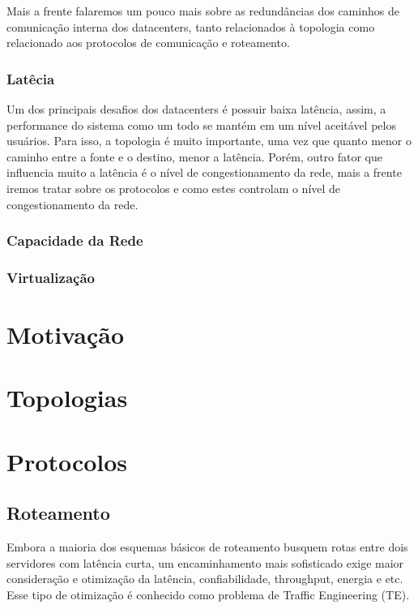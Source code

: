 \documentclass[12pt,a4paper]{report}
\begin{document}
Mais a frente falaremos um pouco mais sobre as redundâncias dos caminhos de comunicação interna dos datacenters, tanto relacionados à topologia como relacionado aos protocolos de comunicação e roteamento.\\

\subsection{Latêcia}
Um dos principais desafios dos datacenters é possuir baixa latência, assim, a performance do sistema como um todo se mantém em um nível aceitável pelos usuários. Para isso, a topologia é muito importante, uma vez que quanto menor o caminho entre a fonte e o destino, menor a latência. Porém, outro fator que influencia muito a latência é o nível de congestionamento da rede, mais a frente iremos tratar sobre os protocolos e como estes controlam o nível de congestionamento da rede.\\

\subsection{Capacidade da Rede}


\subsection{Virtualização}


\chapter{Motivação}

\chapter{Topologias}

\chapter{Protocolos}

\section{Roteamento}

Embora a maioria dos esquemas básicos de roteamento busquem rotas entre
dois servidores com latência curta, um encaminhamento mais sofisticado exige maior
consideração e otimização da latência, confiabilidade, throughput, energia e etc. Esse tipo
de otimização é conhecido como problema de Traffic Engineering (TE).
\end{document}

